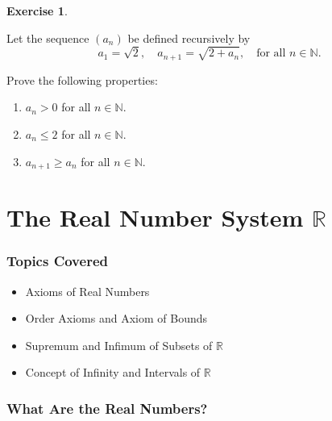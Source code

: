 \documentclass[
]{book}
\providecommand{\tightlist}{%
  \setlength{\itemsep}{0pt}\setlength{\parskip}{0pt}}
\theoremstyle{definition}
\theoremstyle{definition}
\theoremstyle{definition}
\newtheorem{exercise}{Exercise}[chapter]
\theoremstyle{definition}
\theoremstyle{remark}
\begin{document}
\begin{exercise}
\protect\hypertarget{exr:unnamed-chunk-92}{}\label{exr:unnamed-chunk-92}

Let the sequence \((a_n)\) be defined recursively by\\
\[
a_1 = \sqrt{2}, \quad a_{n+1} = \sqrt{2 + a_n}, \quad \text{for all } n \in \mathbb{N}.
\]

Prove the following properties:

\begin{enumerate}
\def\labelenumi{(\alph{enumi})}
\tightlist
\item
  \(a_n > 0\) for all \(n \in \mathbb{N}\).\\
\item
  \(a_n \leq 2\) for all \(n \in \mathbb{N}\).\\
\item
  \(a_{n+1} \geq a_n\) for all \(n \in \mathbb{N}\).
\end{enumerate}

\end{exercise}

\chapter{\texorpdfstring{The Real Number System \(\mathbb{R}\)}{The Real Number System \textbackslash mathbb\{R\}}}\label{the-real-number-system-mathbbr}

\subsection{Topics Covered}\label{topics-covered}

\begin{itemize}
\tightlist
\item
  Axioms of Real Numbers\\
\item
  Order Axioms and Axiom of Bounds\\
\item
  Supremum and Infimum of Subsets of \(\mathbb{R}\)\\
\item
  Concept of Infinity and Intervals of \(\mathbb{R}\)
\end{itemize}

\subsection{What Are the Real Numbers?}\label{what-are-the-real-numbers}
\end{document}
